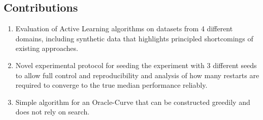\documentclass[]{article}
\begin{document}
\subsection{Contributions}
\begin{enumerate}
	\item Evaluation of Active Learning algorithms on datasets from 4 different domains, including synthetic data that highlights principled shortcomings of existing approaches.
	\item Novel experimental protocol for seeding the experiment with 3 different seeds to allow full control and reproducibility and analysis of how many restarts are required to converge to the true median performance reliably.
	\item Simple algorithm for an Oracle-Curve that can be constructed greedily and does not rely on search.
\end{enumerate}



\end{document}

